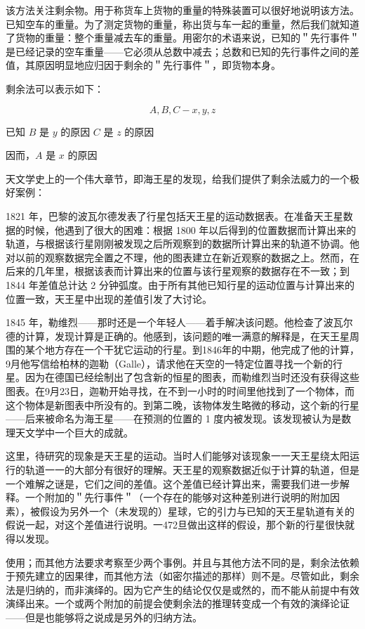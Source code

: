 该方法关注剩余物。用于称货车上货物的重量的特殊装置可以很好地说明该方法。已知空车的重量。为了测定货物的重量，称出货与车一起的重量，然后我们就知道了货物的重量：整个重量减去车的重量。用密尔的术语来说，已知的＂先行事件＂是已经记录的空车重量——它必须从总数中减去；总数和已知的先行事件之间的差值，其原因明显地应归因于剩余的＂先行事件＂，即货物本身。

剩余法可以表示如下：

$$
A, B, C-x, y, z
$$

已知 $B$ 是 $y$ 的原因 $C$ 是 $z$ 的原因

因而，$A$ 是 $x$ 的原因

天文学史上的一个伟大章节，即海王星的发现，给我们提供了剩余法威力的一个极好案例：

1821 年，巴黎的波瓦尔德发表了行星包括天王星的运动数据表。在准备天王星数据的时候，他遇到了很大的困难：根据 1800 年以后得到的位置数据而计算出来的轨道，与根据该行星刚刚被发现之后所观察到的数据所计算出来的轨道不协调。他对以前的观察数据完全置之不理，他的图表建立在新近观察的数据之上。然而，在后来的几年里，根据该表而计算出来的位置与该行星观察的数据存在不一致；到 1844 年差值总计达 2 分钟弧度。由于所有其他已知行星的运动位置与计算出来的位置一致，天王星中出现的差值引发了大讨论。

1845 年，勒维烈——那时还是一个年轻人——着手解决该问题。他检查了波瓦尔德的计算，发现计算是正确的。他感到，该问题的唯一满意的解释是，在天王星周围的某个地方存在一个干犹它运动的行星。到1846年的中期，他完成了他的计算， 9月他写信给柏林的迦勒（Galle），请求他在天空的一特定位置寻找一个新的行星。因为在德国已经绘制出了包含新的恒星的图表，而勒维烈当时还没有获得这些图表。在9月23日，迦勒开始寻找，在不到一小时的时间里他找到了一个物体，而这个物体是新图表中所没有的。到第二晚，该物体发生略微的移动，这个新的行星——后来被命名为海王星——在预测的位置的 1 度内被发现。该发现被认为是数理天文学中一个巨大的成就。\cite{berry1961}

这里，待研究的现象是天王星的运动。当时人们能够对该现象一一天王星绕太阳运行的轨道一一的大部分有很好的理解。天王星的观察数据近似于计算的轨道，但是一个难解之谜是，它们之间的差值。这个差值已经计算出来，需要我们进一步解释。一个附加的＂先行事件＂（一个存在的能够对这种差别进行说明的附加因素），被假设为另外一个（未发现的）星球，它的引力与已知的天王星轨道有关的假说一起，对这个差值进行说明。一472旦做出这样的假设，那个新的行星很快就得以发现。

使用；而其他方法要求考察至少两个事例。并且与其他方法不同的是，剩余法依赖于预先建立的因果律，而其他方法（如密尔描述的那样）则不是。尽管如此，剩余法是归纳的，而非演绎的。因为它产生的结论仅仅是或然的，而不能从前提中有效演绎出来。一个或两个附加的前提会使剩余法的推理转变成一个有效的演绎论证——但是也能够将之说成是另外的归纳方法。

